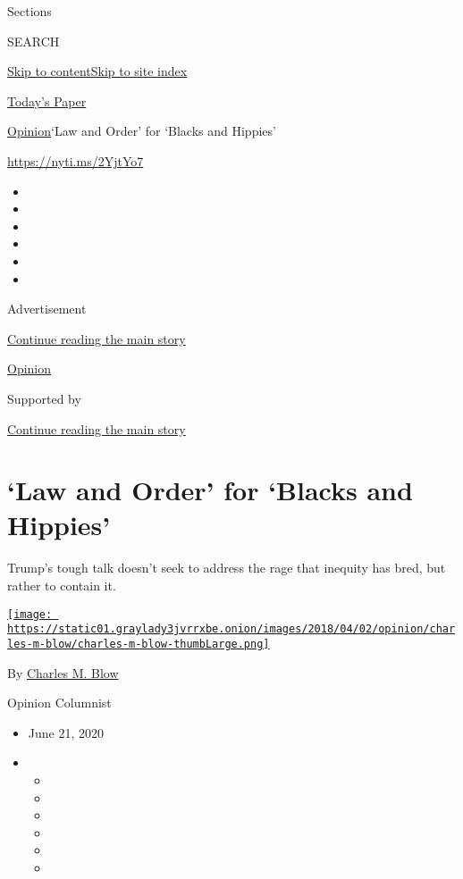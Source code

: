 Sections

SEARCH

\protect\hyperlink{site-content}{Skip to
content}\protect\hyperlink{site-index}{Skip to site index}

\href{https://myaccount.nytimes3xbfgragh.onion/auth/login?response_type=cookie\&client_id=vi}{}

\href{https://www.nytimes3xbfgragh.onion/section/todayspaper}{Today's
Paper}

\href{/section/opinion}{Opinion}\textbar{}`Law and Order' for `Blacks
and Hippies'

\url{https://nyti.ms/2YjtYo7}

\begin{itemize}
\item
\item
\item
\item
\item
\item
\end{itemize}

Advertisement

\protect\hyperlink{after-top}{Continue reading the main story}

\href{/section/opinion}{Opinion}

Supported by

\protect\hyperlink{after-sponsor}{Continue reading the main story}

\hypertarget{law-and-order-for-blacks-and-hippies}{%
\section{`Law and Order' for `Blacks and
Hippies'}\label{law-and-order-for-blacks-and-hippies}}

Trump's tough talk doesn't seek to address the rage that inequity has
bred, but rather to contain it.

\href{https://www.nytimes3xbfgragh.onion/by/charles-m-blow}{\texttt{[image: https://static01.graylady3jvrrxbe.onion/images/2018/04/02/opinion/charles-m-blow/charles-m-blow-thumbLarge.png]}}

By \href{https://www.nytimes3xbfgragh.onion/by/charles-m-blow}{Charles
M. Blow}

Opinion Columnist

\begin{itemize}
\item
  June 21, 2020
\item
  \begin{itemize}
  \item
  \item
  \item
  \item
  \item
  \item
  \end{itemize}
\end{itemize}

